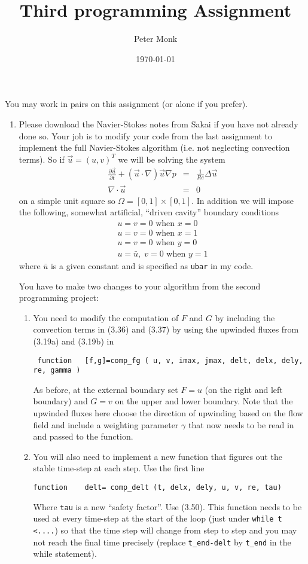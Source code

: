 \documentclass[11pt]{article}
\begin{document}
\title{Third programming Assignment}
\author{Peter Monk}
\date{\today}
\maketitle

You may work in pairs on this assignment (or alone if you prefer).  

\begin{enumerate}
\item Please download the Navier-Stokes notes from Sakai if you have not already done so.  Your job is to modify your code from the
last assignment to implement the full Navier-Stokes algorithm (i.e. not neglecting convection terms).  So if $\vec{u}=(u,v)^T$ we will be solving the  system 
\begin{eqnarray*}
\frac{\partial \vec{u}}{\partial t}+(\vec{u}\cdot\nabla)\vec{u}\nabla p&=&\frac{1}{Re}\Delta\vec{u}\\
\nabla\cdot\vec{u}&=&0
\end{eqnarray*}
on a simple unit square so $\Omega=[0,1]\times [0,1]$.  In addition we will impose the following, somewhat artificial, ``driven cavity'' boundary conditions
\begin{eqnarray*}
u=v=0\mbox{ when }x=0\\
u=v=0\mbox{ when }x=1\\
u=v=0\mbox{ when }y=0\\
u=\bar{u},\;v=0\mbox{ when } y=1
\end{eqnarray*}
where $\bar{u}$ is a given constant and is specified as \verb+ubar+ in my code.

You have to make two changes to your algorithm from the second programming project:
\begin{enumerate}
\item You need to modify the computation of $F$ and $G$ by including the convection terms in  (3.36) and (3.37) by using the upwinded fluxes from (3.19a) and (3.19b) in
\begin{verbatim}
 function   [f,g]=comp_fg ( u, v, imax, jmax, delt, delx, dely, re, gamma )
    \end{verbatim}
 As before, at the external boundary set $F=u$ (on the right and left boundary) and $G=v$ on the upper and lower boundary.  Note that the upwinded fluxes here choose the direction of upwinding based on the flow field and include a weighting parameter $\gamma$ that now needs to be read in and passed to the function.
\item
You will also need to implement a new function that figures out the stable time-step at each step. Use the first line
\begin{verbatim}
function    delt= comp_delt (t, delx, dely, u, v, re, tau) 
\end{verbatim}
Where \verb+tau+ is a new ``safety factor''.  Use (3.50).  This function needs to be used at every time-step at the start of the loop (just under \verb+while t <....+)  so that the time step will change from step to step and you may not reach the final time precisely (replace \verb+t_end-delt+ by \verb+t_end+ in the while statement).


\end{enumerate}
\end{enumerate}
\end{document}
